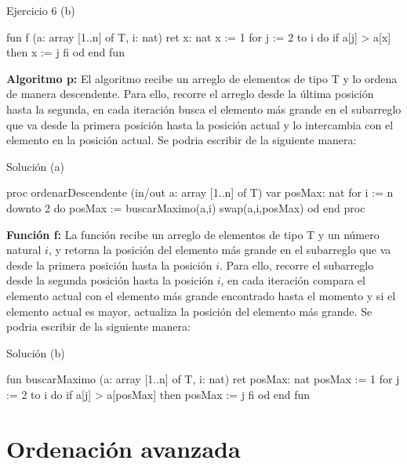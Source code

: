 \begin{codebox}{Ejercicio 6 (b)}
\begin{pascallike}
fun f (a: array [1..n] of T, i: nat) ret x: nat
    x := 1
    for j := 2 to i do
    if a[j] > a[x] then
        x := j
    fi
    od
end fun
\end{pascallike}
\end{codebox}

\textbf{Algoritmo p:} El algoritmo recibe un arreglo de elementos de tipo T y lo ordena de manera descendente. Para ello, recorre el arreglo desde la última posición hasta la segunda, en cada iteración busca el elemento más grande en el subarreglo que va desde la primera posición hasta la posición actual y lo intercambia con el elemento en la posición actual.
Se podria escribir de la siguiente manera:

\begin{codebox}{Solución (a)}
\begin{pascallike}
proc ordenarDescendente (in/out a: array [1..n] of T)
    var posMax: nat
    for i := n downto 2 do
    posMax := buscarMaximo(a,i)
    swap(a,i,posMax)
    od
end proc
\end{pascallike}
\end{codebox}

\textbf{Función f:} La función recibe un arreglo de elementos de tipo T y un número natural $i$, y retorna la posición del elemento más grande en el subarreglo que va desde la primera posición hasta la posición $i$. Para ello, recorre el subarreglo desde la segunda posición hasta la posición $i$, en cada iteración compara el elemento actual con el elemento más grande encontrado hasta el momento y si el elemento actual es mayor, actualiza la posición del elemento más grande.
Se podria escribir de la siguiente manera:

\begin{codebox}{Solución (b)}
\begin{pascallike}
fun buscarMaximo (a: array [1..n] of T, i: nat) ret posMax: nat
    posMax := 1
    for j := 2 to i do
    if a[j] > a[posMax] then
        posMax := j
    fi
    od
end fun
\end{pascallike}
\end{codebox}

\section{Ordenación avanzada}

